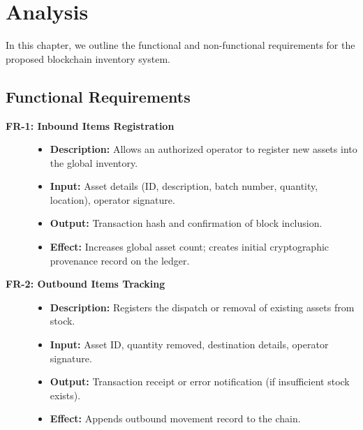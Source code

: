 \documentclass[11pt,a4paper]{memoir}
\begin{document}
\chapter{Analysis}\label{ch:analysis}

In this chapter, we outline the functional and non-functional requirements for the proposed blockchain inventory system.

\section{Functional Requirements}

\begin{description}
    \item[\textbf{FR-1: Inbound Items Registration}]\hfill
    \begin{itemize}
        \item \textbf{Description:} Allows an authorized operator to register new assets into the global inventory.
        \item \textbf{Input:} Asset details (ID, description, batch number, quantity, location), operator signature.
        \item \textbf{Output:} Transaction hash and confirmation of block inclusion.
        \item \textbf{Effect:} Increases global asset count; creates initial cryptographic provenance record on the ledger.
    \end{itemize}

    \item[\textbf{FR-2: Outbound Items Tracking}]\hfill
    \begin{itemize}
        \item \textbf{Description:} Registers the dispatch or removal of existing assets from stock.
        \item \textbf{Input:} Asset ID, quantity removed, destination details, operator signature.
        \item \textbf{Output:} Transaction receipt or error notification (if insufficient stock exists).
        \item \textbf{Effect:} Appends outbound movement record to the chain.
    \end{itemize}


\end{description}
\end{document}
